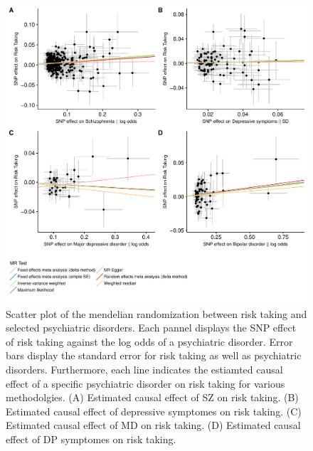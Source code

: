 \begin{figure}[htpb]
  \centering
  \includegraphics[width=0.8\linewidth]{./figures/mr_risk.pdf}
  \caption{
    Scatter plot of the mendelian randomization between risk taking and selected psychiatric disorders.
    Each pannel displays the SNP effect of risk taking against the log odds of a psychiatric disorder.
    Error bars display the standard error for risk taking as well as psychiatric disorders.
    Furthermore, each line indicates the estiamted causal effect of a specific psychiatric disorder on risk taking for various methodolgies.
    (A) Estimated causal effect of SZ on risk taking.
    (B) Estimated causal effect of depressive symptomes on risk taking.
    (C) Estimated causal effect of MD on risk taking.
    (D) Estimated causal effect of DP symptomes on risk taking.
  }\label{fig:mr_risk}
\end{figure}
